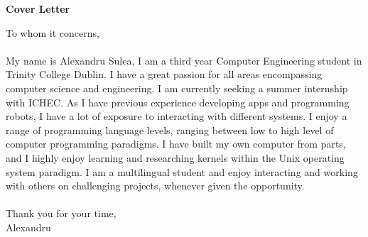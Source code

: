 \documentclass{article}
\begin{document}
\begin{titlepage}
	\begin{center}
	\huge{\bfseries Cover Letter}\\	
	[0mm]
	
	\end{center}
	






		
		
		
\vspace*{2cm}
		
		
		
\noindent To whom it concerns,\\
\\
	My name is Alexandru Sulea, I am a third year Computer Engineering student in Trinity College Dublin. I have a great passion for all areas encompassing computer science and engineering. I am currently seeking a summer internship with ICHEC. As I have previous experience developing apps and programming robots, I have a lot of exposure to interacting with different systems. I enjoy a range of programming language levels, ranging between low to high level of computer programming paradigms. I have built my own computer from parts, and I highly enjoy learning and researching kernels within the Unix operating system paradigm. I am a multilingual student and enjoy interacting and working with others on challenging projects, whenever given the opportunity.\\
\\
Thank you for your time,\\
Alexandru\\

\end{titlepage}
\end{document}
